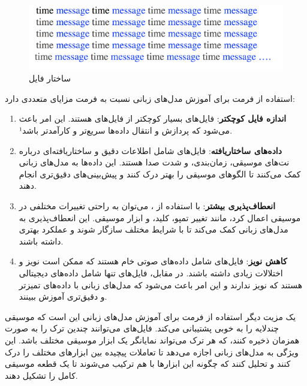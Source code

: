 \begin{figure}[!htb]
      \centering
      \includegraphics[scale=1]{Figures/Screenshot 2024-08-29 021655.png}
      \caption{ساختار فایل 
      }
      \label{Fig:MIDI}
\end{figure}

استفاده از فرمت  برای آموزش مدل‌های زبانی نسبت به فرمت  مزایای
متعددی دارد:

\begin{enumerate}
      \def\labelenumi{\arabic{enumi}.}
      \item
            \textbf{اندازه فایل کوچکتر}: فایل‌های  بسیار کوچکتر از فایل‌های 
            هستند. این امر باعث می‌شود که پردازش و انتقال داده‌ها سریع‌تر و کارآمدتر
            باشد¹.
      \item
            \textbf{داده‌های ساختاریافته}: فایل‌های  شامل اطلاعات دقیق و
            ساختاریافته‌ای درباره نت‌های موسیقی، زمان‌بندی، و شدت صدا هستند. این
            داده‌ها به مدل‌های زبانی کمک می‌کنند تا الگوهای موسیقی را بهتر درک کنند و
            پیش‌بینی‌های دقیق‌تری انجام دهند.
      \item
            \textbf{انعطاف‌پذیری بیشتر}: با استفاده از ، می‌توان به راحتی
            تغییرات مختلفی در موسیقی اعمال کرد، مانند تغییر تمپو، کلید، و ابزار
            موسیقی. این انعطاف‌پذیری به مدل‌های زبانی کمک می‌کند تا با شرایط مختلف
            سازگار شوند و عملکرد بهتری داشته باشند.
      \item
            \textbf{کاهش نویز}: فایل‌های  شامل داده‌های صوتی خام هستند که ممکن
            است نویز و اختلالات زیادی داشته باشند. در مقابل، فایل‌های  تنها
            شامل داده‌های دیجیتالی هستند که نویز ندارند و این امر باعث می‌شود که
            مدل‌های زبانی با داده‌های تمیزتر و دقیق‌تری آموزش ببینند.
\end{enumerate}

یک مزیت دیگر استفاده از فرمت  برای آموزش مدل‌های زبانی این است که موسیقی چندلایه را به خوبی پشتیبانی می‌کند. فایل‌های  می‌توانند چندین ترک  را به صورت همزمان ذخیره کنند، که هر ترک می‌تواند نمایانگر یک ابزار موسیقی مختلف باشد. این ویژگی به مدل‌های زبانی اجازه می‌دهد تا تعاملات پیچیده بین ابزارهای مختلف را درک کنند و تحلیل کنند که چگونه این ابزارها با هم ترکیب می‌شوند تا یک قطعه موسیقی کامل را تشکیل دهند.

